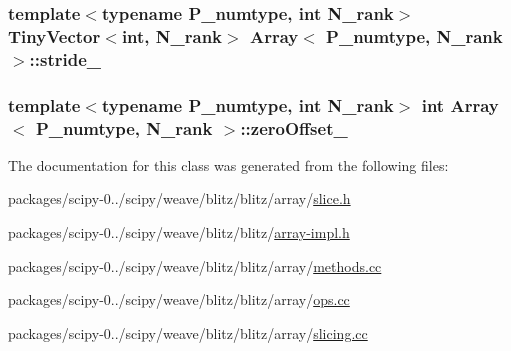 \subsubsection[{stride\+\_\+}]{\setlength{\rightskip}{0pt plus 5cm}template$<$typename P\+\_\+numtype, int N\+\_\+rank$>$ {\bf Tiny\+Vector}$<$int, N\+\_\+rank$>$ {\bf Array}$<$ P\+\_\+numtype, N\+\_\+rank $>$\+::stride\+\_\+\hspace{0.3cm}{\ttfamily [protected]}}\label{classArray_ae69b93c4b923f1e95cf14421da3a8d72}
\hypertarget{classArray_a4a97370700e3ddf3b894bfb402a7ff11}{}
\subsubsection[{zero\+Offset\+\_\+}]{\setlength{\rightskip}{0pt plus 5cm}template$<$typename P\+\_\+numtype, int N\+\_\+rank$>$ int {\bf Array}$<$ P\+\_\+numtype, N\+\_\+rank $>$\+::zero\+Offset\+\_\+\hspace{0.3cm}{\ttfamily [protected]}}\label{classArray_a4a97370700e3ddf3b894bfb402a7ff11}


The documentation for this class was generated from the following files\+:\begin{DoxyCompactItemize}
\item 
packages/scipy-\/0../scipy/weave/blitz/blitz/array/\hyperlink{slice_8h}{slice.\+h}\item 
packages/scipy-\/0../scipy/weave/blitz/blitz/\hyperlink{array-impl_8h}{array-\/impl.\+h}\item 
packages/scipy-\/0../scipy/weave/blitz/blitz/array/\hyperlink{methods_8cc}{methods.\+cc}\item 
packages/scipy-\/0../scipy/weave/blitz/blitz/array/\hyperlink{ops_8cc}{ops.\+cc}\item 
packages/scipy-\/0../scipy/weave/blitz/blitz/array/\hyperlink{slicing_8cc}{slicing.\+cc}\end{DoxyCompactItemize}
